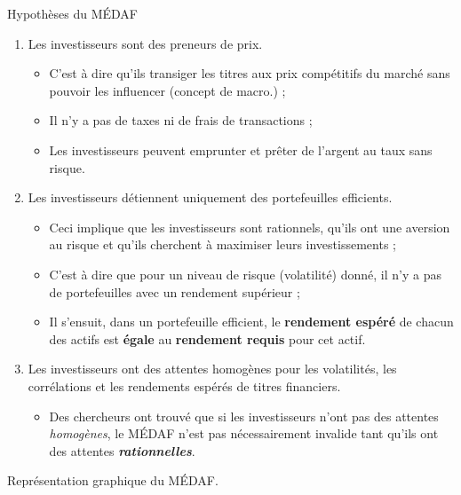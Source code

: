\documentclass[10pt, french]{article}
\begin{document}
\begin{multicols*}{2}
\begin{conceptgen}{Hypothèses du MÉDAF}
\begin{enumerate}[label = \circled{\arabic*}{lightgray}]
	\item	Les investisseurs sont des preneurs de prix.
		\begin{itemize}
		\item	C'est à dire qu'ils transiger les titres aux prix compétitifs du marché sans pouvoir les influencer (concept de macro.) ;
		\item	Il n'y a pas de taxes ni de frais de transactions ;
		\item	Les investisseurs peuvent emprunter et prêter de l'argent au taux sans risque.
		\end{itemize}
	\item	Les investisseurs détiennent uniquement des portefeuilles efficients.
		\begin{itemize}
		\item	Ceci implique que les investisseurs sont rationnels, qu’ils ont une aversion au risque et qu'ils cherchent à maximiser leurs investissements ;
		\item	C'est à dire que pour un niveau de risque (volatilité) donné, il n'y a pas de portefeuilles avec un rendement supérieur ;
		\item	Il s'ensuit, dans un portefeuille efficient, le \textbf{rendement espéré} de chacun des actifs est \textbf{égale} au \textbf{rendement requis} pour cet actif.
		\end{itemize}
	\item	Les investisseurs ont des attentes homogènes pour les volatilités, les corrélations et les rendements espérés de titres financiers.
		\begin{itemize}
		\item	Des chercheurs ont trouvé que si les investisseurs n'ont pas des attentes \textit{homogènes}, le MÉDAF n'est pas nécessairement invalide tant qu'ils ont des attentes \textit{\textbf{rationnelles}}.
		\end{itemize}
\end{enumerate}
\end{conceptgen}

\begin{definitionNOHFILLsub}
Représentation graphique du MÉDAF.

\begin{center}


\end{center}
\end{definitionNOHFILLsub}
\end{multicols*}
\end{document}
